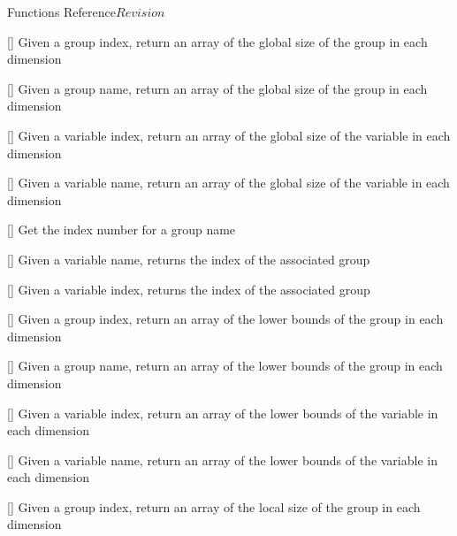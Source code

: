 \begin{cactuspart}{ Functions Reference}{}{$Revision$}
\begin{Lentry}
\item[\code{CCTK\_GroupgshGI}] [\pageref{CCTK-GroupgshGI}]
  Given a group index, return an array of the global size
  of the group in each dimension

\item[\code{CCTK\_GroupgshGN}] [\pageref{CCTK-GroupgshGN}]
  Given a group name, return an array of the global size
  of the group in each dimension

\item[\code{CCTK\_GroupgshVI}] [\pageref{CCTK-GroupgshVI}]
  Given a variable index, return an array of the global size
  of the variable in each dimension

\item[\code{CCTK\_GroupgshVN}] [\pageref{CCTK-GroupgshVN}]
  Given a variable name, return an array of the global size
  of the variable in each dimension

\item[\code{CCTK\_GroupIndex}] [\pageref{CCTK-GroupIndex}]
  Get the index number for a group name

\item[\code{CCTK\_GroupIndexFromVar}] [\pageref{CCTK-GroupIndexFromVar}]
  Given a variable name, returns the index of the associated group

\item[\code{CCTK\_GroupIndexFromVarI}] [\pageref{CCTK-GroupIndexFromVarI}]
  Given a variable index, returns the index of the associated group

\item[\code{CCTK\_GrouplbndGI}] [\pageref{CCTK-GrouplbndGI}]
  Given a group index, return an array of the lower bounds
  of the group in each dimension

\item[\code{CCTK\_GrouplbndGN}] [\pageref{CCTK-GrouplbndGN}]
  Given a group name, return an array of the lower bounds
  of the group in each dimension

\item[\code{CCTK\_GrouplbndVI}] [\pageref{CCTK-GrouplbndVI}]
  Given a variable index, return an array of the lower bounds
  of the variable in each dimension

\item[\code{CCTK\_GrouplbndVN}] [\pageref{CCTK-GrouplbndVN}]
  Given a variable name, return an array of the lower bounds
  of the variable in each dimension

\item[\code{CCTK\_GrouplshGI}] [\pageref{CCTK-GrouplshGI}]
  Given a group index, return an array of the local size
  of the group in each dimension


\end{Lentry}
\end{cactuspart}
